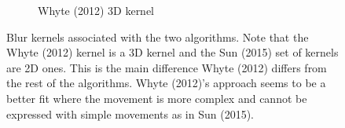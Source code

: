 \documentclass[10pt,twocolumn,letterpaper]{article}
\begin{document}
\begin{figure}
\begin{center}
\begin{subfigure}{0.58\textwidth}
\caption{Whyte \etal (2012) 3D kernel}
\label{fig:subim3}
\end{subfigure}
 
\caption{Blur kernels associated with the two algorithms. Note that the Whyte \etal (2012) kernel is a 3D kernel and the Sun \etal (2015) set of kernels are 2D ones. This is the main difference Whyte \etal (2012) differs from the rest of the algorithms. Whyte \etal (2012)'s approach seems to be a better fit where the movement is more complex and cannot be expressed with simple movements as in Sun \etal (2015).}
\label{fig:image2}
\end{center}
\end{figure}

\begin{figure}
\begin{center}
\graphicspath{ {deblursun/} }
\begin{subfigure}{0.23\textwidth}


\end{subfigure}
\end{center}
\end{figure}
\end{document}
